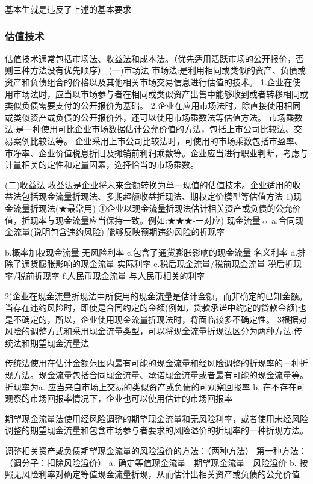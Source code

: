 \documentclass[UTF8,12pt]{ctexart}
\numberwithin{equation}{section} %
\numberwithin{figure}{section}
\numberwithin{table}{section}
\begin{document}
	基本生就是违反了上述的基本要求

	\subsubsection{估值技术}
	估值技术通常包括市场法、收益法和成本法。（优先适用活跃市场的公开报价，否则三种方法没有优先顺序）
	(一)市场法
	市场法:是利用相同或类似的资产、负债或资产和负债组合的价格以及其他相关市场交易信息进行估值的技术。
	1.企业在使用市场法时，应当以市场参与者在相同或类似资产出售中能够收到或者转移相同或类似负债需要支付的公开报价为基础。
	2.企业在应用市场法时，除直接使用相同或类似资产或负债的公开报价外，还可以使用市场乘数法等估值方法。
	市场乘数法:是一种使用可比企业市场数据估计公允价值的方法，包括上市公司比较法、交易案例比较法等。
	企业采用上市公司比较法时，可使用的市场乘数包括市盈率、市净率、企业价值税息折旧及摊销前利润乘数等。企业应当进行职业判断，考虑与计量相关的定性和定量因素，选择恰当的市场乘数。
	
	(二)收益法
	收益法是企业将未来金额转换为单一现值的估值技术。企业适用的收益法包括现金流量折现法、多期超额收益折现法、期权定价模型等估值方法
	1)现金流量折现法(★最常用)
	①企业以现金流量折现法估计相关资产或负债的公允价值，折现率与现金流量应当保持一致。例如:★★★-一对应)
	现金流量↔
	a.合同现金流量(说明包含违约风险) 能够反映预期违约风险的折现率
	
	b.概率加权现金流量 无风险利率
	c.包含了通货膨胀影响的现金流量 名义利率
	d.排除了通货膨胀影响的现金流量 实际利率
	e.税后现金流量/税前现金流量 税后折现率/税前折现率
	f.人民币现金流量 与人民币相关的利率
	
	2)企业在现金流量折现法中所使用的现金流量是估计金额，而非确定的已知金额。
	当存在违约风险时，即使是合同约定的金额(例如，贷款承诺中约定的贷款金额)也是不确定的，所以，企业使用现金流量折现法时，将面临较多不确定性。
	3根据对风险的调整方式和采用现金流量类型，可以将现金流量折现法区分为两种方法:传统法和期望现金流量法
	
	传统法使用在估计金额范围内最有可能的现金流量和经风险调整的折现率的一种折现方法。现金流量包括合同现金流量、承诺现金流量或者最有可能的现金流量等。折现率为a.	应当来自市场上交易的类似资产或负债的可观察回报率
	b.	在不存在可观察的市场回报率情况下，企业也可以使用估计的市场回报率
	
	期望现金流量法使用经风险调整的期望现金流量和无风险利率，或者使用未经风险调整的期望现金流量和包含市场参与者要求的风险溢价的折现率的一种折现方法。
	
	调整相关资产或负债期望现金流量的风险溢价的方法：（两种方法）
	第一种方法：（调分子：扣除风险溢价）
	a.	确定等值现金流量＝期望现金流量—风险溢价
	b.	按照无风险利率对确定等值现金流量折现，从而估计出相关资产或负债的公允价值
	
\end{document}
